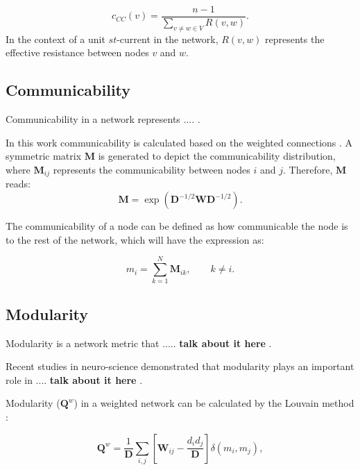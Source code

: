\documentclass[fleqn,10pt,  reprint, amsmath,amssymb,aps, floatfix]{wlscirep}
\begin{document}
\begin{equation}
	c_{CC}(v) = \frac{n-1}{\sum \limits_{v \neq w \in V} R(v,w)}.
	\label{eq:ecc}
\end{equation}
In the context of a unit $st$-current in the network, $R(v,w)$ represents the effective resistance between nodes $v$ and $w$.

\subsection*{Communicability}
Communicability in a network represents .... \cite{Estrada2008}. 

In this work communicability is calculated based on the weighted connections \cite{Crofts2009}. A symmetric matrix $\mathbf M$ is generated to depict the communicability distribution, where $\mathbf M_{ij}$ represents the communicability between nodes $i$ and $j$. Therefore, $\mathbf M$ reads:
\begin{equation}
\mathbf M = \exp{(\mathbf D^{-1/2} \mathbf W \mathbf D^{-1/2})}.
\end{equation} 

The communicability of a node can be defined as how communicable the node is to the rest of the network, which will have the expression as:

\begin{equation}
	m_i = \sum \limits_{k = 1}^N \mathbf M_{ik}, \qquad k \neq i.
	\label{eq:ncomm}
\end{equation}



\subsection*{Modularity}
Modularity is a network metric that ..... \textbf{talk about it here} \cite{Rubinov2009}.

Recent studies in neuro-science demonstrated that modularity plays an important role in .... \textbf{talk about it here} \cite{Godwin2015}. 
 
Modularity ($\mathbf Q^w$) in a weighted network can be calculated by the Louvain method \cite{Blondel2008}:
 
\begin{equation}
\mathbf Q^w = \frac{1}{\mathbf D} \sum \limits_{i,j} \left[\mathbf W_{ij} - \frac{d_i d_j}{\mathbf D} \right] \delta(m_i, m_j),
\label{eq:mod}
\end{equation}
\end{document}
